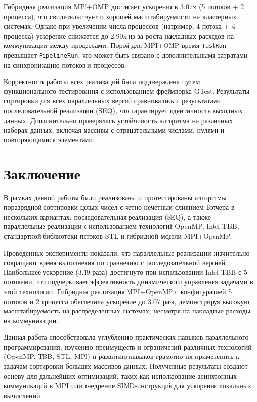 \documentclass[a4paper,12pt]{article}
\begin{document}
Гибридная реализация MPI+OMP достигает ускорения в 3.07x (5 потоков + 2 процесса), что свидетельствует о хорошей масштабируемости на кластерных системах. Однако при увеличении числа процессов (например, 4 потока + 4 процесса) ускорение снижается до 2.90x из-за роста накладных расходов на коммуникации между процессами. Порой для MPI+OMP время \texttt{TaskRun} превышает \texttt{PipelineRun}, что может быть связано с дополнительными затратами на синхронизацию потоков и процессов.

Корректность работы всех реализаций была подтверждена путем функционального тестирования с использованием фреймворка GTest. Результаты сортировки для всех параллельных версий сравнивались с результатами последовательной реализации (SEQ), что гарантирует идентичность выходных данных. Дополнительно проверялась устойчивость алгоритма на различных наборах данных, включая массивы с отрицательными числами, нулями и повторяющимися элементами.

\section*{Заключение}

В рамках данной работы были реализованы и протестированы алгоритмы поразрядной сортировки целых чисел с четно-нечетным слиянием Бэтчера в нескольких вариантах: последовательная реализация (SEQ), а также параллельные реализации с использованием технологий OpenMP, Intel TBB, стандартной библиотеки потоков STL и гибридной модели MPI+OpenMP.

Проведенные эксперименты показали, что параллельные реализации значительно сокращают время выполнения по сравнению с последовательной версией. Наибольшее ускорение (3.19 раза) достигнуто при использовании Intel TBB с 5 потоками, что подчеркивает эффективность динамического управления задачами в этой технологии. Гибридная реализация MPI+OpenMP с конфигурацией 5 потоков и 2 процесса обеспечила ускорение до 3.07 раза, демонстрируя высокую масштабируемость на распределенных системах, несмотря на накладные расходы на коммуникации.

Данная работа способствовала углублению практических навыков параллельного программирования, изучению преимуществ и ограничений различных технологий (OpenMP, TBB, STL, MPI) и развитию навыков грамотно их примененить к задачам сортировки больших массивов данных. 
Полученные результаты создают основу для дальнейших оптимизаций, таких как использование асинхронных коммуникаций в MPI или внедрение SIMD-инструкций для ускорения локальных вычислений.
\end{document}
